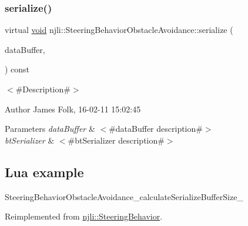 \mbox{\label{classnjli_1_1_steering_behavior_obstacle_avoidance_a24d56edf67f8dc605dcc7897f5ba87e8}} 
\subsubsection{\texorpdfstring{serialize()}{serialize()}}
{\footnotesize\ttfamily virtual \mbox{\hyperlink{_thread_8h_af1e856da2e658414cb2456cb6f7ebc66}{void}} njli\+::\+Steering\+Behavior\+Obstacle\+Avoidance\+::serialize (\begin{DoxyParamCaption}\item[{\mbox{\hyperlink{_thread_8h_af1e856da2e658414cb2456cb6f7ebc66}{void}} $\ast$}]{data\+Buffer,  }\item[{bt\+Serializer $\ast$}]{ }\end{DoxyParamCaption}) const\hspace{0.3cm}{\ttfamily [virtual]}}



$<$\#\+Description\#$>$ 

\begin{DoxyAuthor}{Author}
James Folk, 16-\/02-\/11 15\+:02\+:45
\end{DoxyAuthor}

\begin{DoxyParams}{Parameters}
{\em data\+Buffer} & $<$\#data\+Buffer description\#$>$ \\
\hline
{\em bt\+Serializer} & $<$\#bt\+Serializer description\#$>$\\
\hline
\end{DoxyParams}
\hypertarget{classnjli_1_1_steering_behavior_wander_ex1}{}\subsection{Lua example}\label{classnjli_1_1_steering_behavior_wander_ex1}

\begin{DoxyCodeInclude}
\end{DoxyCodeInclude}
Steering\+Behavior\+Obstacle\+Avoidance\+\_\+calculate\+Serialize\+Buffer\+Size\+\_\+ 

Reimplemented from \mbox{\hyperlink{classnjli_1_1_steering_behavior_aa8494cb4a327c0040f64cfe8b393786e}{njli\+::\+Steering\+Behavior}}.

